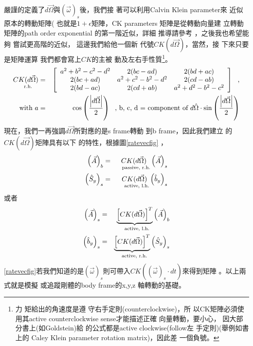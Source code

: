 \documentclass[12pt,a4paper]{article}
\begin{document}
嚴謹的定義了$d\vec{\Omega}$與$%
\left( \vec{\omega}\right) _{s}$後，我們接%
著可以利用Calvin Klein parameter來%
近似原本的轉動矩陣(%
也就是$1+\epsilon $矩陣，CK parameters%
矩陣是從轉動向量建%
立轉動矩陣的path order exponential%
的第一階近似，詳細%
推導請參考\cite[p. 4750]{tong}%
，之後我也希望能夠%
嘗試更高階的近似，%
這邊我們給他一個新%
代號$CK(d\vec{\Omega})$，當然，接%
下來只要是矩陣運算%
我們都會寫上$CK$的主被%
動及左右手性質\footnote{力%
矩給出的角速度是遵%
守右手定則(counterclockwise)，所%
以CK矩陣必須使用其active
counterclockwise sense才能描述正確%
向量轉動，要小心，%
因大部分書上(如Goldstein)給%
的公式都是active clockwise(follow左%
手定則)(舉例如書上的%
Caley Klein parameter rotation matrix)，因此差%
一個負號。}。%
\begin{eqnarray*}
\underset{\text{r.h.}}{CK(d\vec{\Omega})} &=&\left[ 
\begin{array}{ccc}
a^{2}+b^{2}-c^{2}-d^{2} & 2(bc-ad) & 2(bd+ac) \\ 
2(bc+ad) & a^{2}+c^{2}-b^{2}-d^{2} & 2(cd-ab) \\ 
2(bd-ac) & 2(cd+ab) & a^{2}+d^{2}-b^{2}-c^{2}%
\end{array}%
\right] \text{,} \\
\text{with }a &=&\cos \left( \frac{\left\vert d\vec{\Omega}\right\vert }{2}%
\right) \text{, b, c, d = component of }d\hat{\Omega}\cdot \sin \left( \frac{%
\left\vert d\vec{\Omega}\right\vert }{2}\right)
\end{eqnarray*}%
現在，我們一再強調$d%
\vec{\Omega}$所對應的是s frame轉動%
到b frame，因此我們建立%
的$CK(d\vec{\Omega})$矩陣具有以下%
的特性，根據圖\ref{ratevecfig}%
，%
\begin{eqnarray*}
\left( \vec{A}\right) _{b} &=&\underset{\text{passive, r.h.}}{CK(d\vec{\Omega%
})}\left( \vec{A}\right) _{s} \\
\left( \hat{S}_{y}\right) _{s} &=&\underset{\text{active, l.h.}}{CK(d\vec{%
\Omega})}\left( \hat{b}_{y}\right) _{s}
\end{eqnarray*}%
或者%
\begin{eqnarray}
\left( \vec{A}\right) _{s} &=&\underset{\text{active, l.h.}}{\underbrace{%
\left[ CK(d\vec{\Omega})\right] ^{T}}}\left( \vec{A}\right) _{b}
\label{frametrans} \\
\left( \hat{b}_{y}\right) _{s} &=&\underset{\text{active, r.h.}}{\underbrace{%
\left[ CK(d\vec{\Omega})\right] ^{T}}}\left( \hat{S}_{y}\right) _{s}
\label{vecrot}
\end{eqnarray}%
\ref{ratevecfig}若我們知道的是$%
\left( \vec{\omega}\right) _{s}$則可帶入$CK(\left( 
\vec{\omega}\right) _{s}\cdot dt)$來得到矩陣%
。以上兩式就是模擬%
或追蹤剛體的body frame的x,y,z%
軸轉動的基礎。
\end{document}
